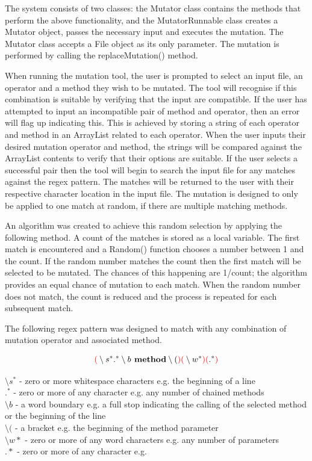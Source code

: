 \documentclass[a4paper,12pt]{article}
\begin{document}
The system consists of two classes: the Mutator class contains the methods that perform the above functionality, and the MutatorRunnable class creates a Mutator object, passes the necessary input and executes the mutation. The Mutator class accepts a File object as its only parameter. The mutation is performed by calling the replaceMutation() method.  

When running the mutation tool, the user is prompted to select an input file, an operator and a method they wish to be mutated. The tool will recognise if this combination is suitable by verifying that the input are compatible. If the user has attempted to input an incompatible pair of method and operator, then an error will flag up indicating this. This is achieved by storing a string of each operator and method in an ArrayList related to each operator. When the user inputs their desired mutation operator and method, the strings will be compared against the ArrayList contents to verify that their options are suitable. If the user selects a successful pair then the tool will begin to search the input file for any matches against the regex pattern. The matches will be returned to the user with their respective character location in the input file. The mutation is designed to only be applied to one match at random, if there are multiple matching methods. 

An algorithm was created to achieve this random selection by applying the following method. A count of the matches is stored as a local variable. The first match is encountered and a Random() function chooses a number between 1 and the count. If the random number matches the count then the first match will be selected to be mutated. The chances of this happening are 1/count; the algorithm provides an equal chance of mutation to each match. When the random number does not match, the count is reduced and the process is repeated for each subsequent match.

The following regex pattern was designed to match with any combination of mutation operator and associated method.

\begin{equation}
    \textbf{$\color{red}($}\setminus s^*.^*\setminus b \textbf{ method} \setminus (\textbf{$\color{red})($}\setminus w^*\textbf{$\color{red})($}.^*\textbf{$\color{red})$}    
\end{equation}

\noindent$ \setminus s^* $ - zero or more whitespace characters e.g. the beginning of a line
\\$ .^* $ - zero or more of any character e.g. any number of chained methods
\\$\setminus b$ - a word boundary e.g. a full stop indicating the calling of the selected method or the beginning of the line
\\$\setminus ($ - a bracket e.g. the beginning of the method parameter
\\$\setminus w*$ - zero or more of any word characters e.g. any number of parameters
\\$.*$ - zero or more of any character e.g.
\end{document}
